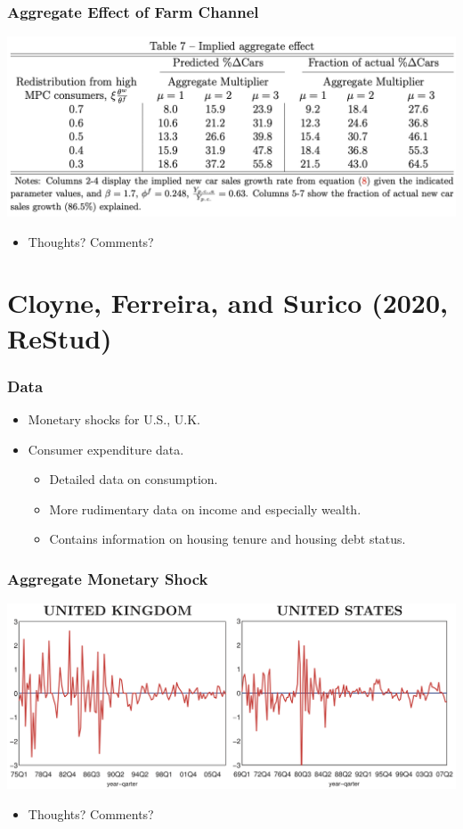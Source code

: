 \documentclass[english,xcolor=svgnames]{beamer}
\begin{document}
\begin{frame}
\frametitle[alignment=center]{Aggregate Effect of Farm Channel}
\centering
\includegraphics[scale=0.4]{figures/HRWTAB7.png}
\begin{itemize}
	\item Thoughts? Comments?
\end{itemize}
\end{frame}

\section{Cloyne, Ferreira, and Surico (2020, ReStud)}

\begin{frame}
\frametitle[alignment=center]{Data}
\begin{itemize}
	\item Monetary shocks for U.S., U.K.
	\item Consumer expenditure data.
	\begin{itemize}
		\item Detailed data on consumption.
		\item More rudimentary data on income and especially wealth.
		\item Contains information on housing tenure and housing debt status.
	\end{itemize}
\end{itemize}
\end{frame}


\begin{frame}
\frametitle[alignment=center]{Aggregate Monetary Shock}
\centering
\includegraphics[scale=0.3]{figures/CFSFIG2.png}
\begin{itemize}
	\item Thoughts? Comments?
\end{itemize}
\end{frame}
\end{document}
